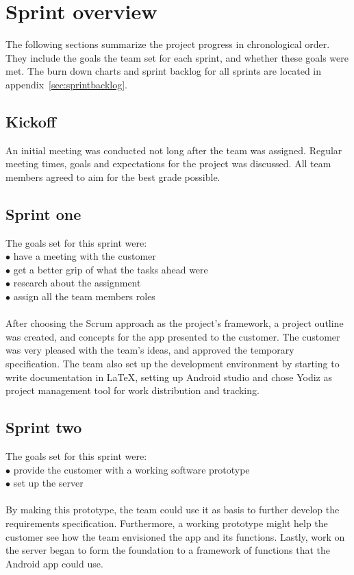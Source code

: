 \newpage
\section{Sprint overview}
\label{sec:sprintOverview}
The following sections summarize the project progress in chronological order. They include the goals the team set for each sprint, and whether these goals were met. The burn down charts and sprint backlog for all sprints are located in appendix~\ref{sec:sprintbacklog}.

\subsection{Kickoff}
An initial meeting was conducted not long after the team was assigned. Regular meeting times, goals and expectations for the project was discussed. All team members agreed to aim for the best grade possible.

\subsection{Sprint one}
The goals set for this sprint were:\\
$\bullet$\hspace{0.25cm} have a meeting with the customer\\
$\bullet$\hspace{0.25cm} get a better grip of what the tasks ahead were\\
$\bullet$\hspace{0.25cm} research about the assignment\\
$\bullet$\hspace{0.25cm} assign all the team members roles\\\\
After choosing the Scrum approach as the project's framework, a project outline was created, and concepts for the app presented to the customer. The customer was very pleased with the team's ideas, and approved the temporary specification. The team also set up the development environment by starting to write documentation in LaTeX, setting up Android studio and chose Yodiz as project management tool for work distribution and tracking.

\subsection{Sprint two}
The goals set for this sprint were:\\
$\bullet$\hspace{0.25cm} provide the customer with a working software prototype\\
$\bullet$\hspace{0.25cm} set up the server\\\\
By making this prototype, the team could use it as basis to further develop the requirements specification. Furthermore, a working prototype might help the customer see how the team envisioned the app and its functions. Lastly, work on the server began to form the foundation to a framework of functions that the Android app could use. 


